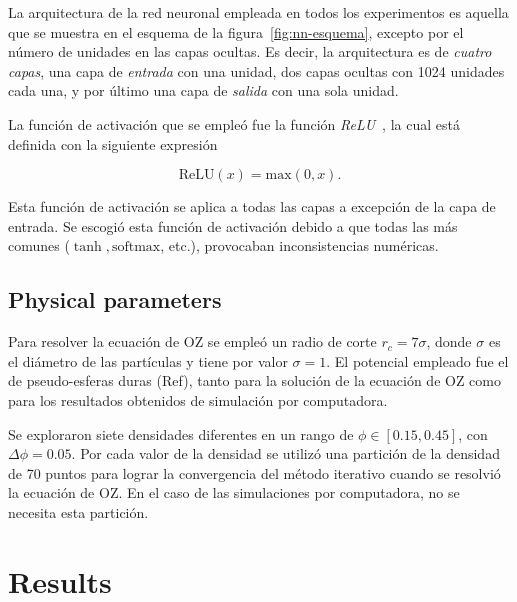 La arquitectura de la red neuronal empleada en todos los experimentos es aquella que se
muestra en el esquema de la figura~\ref{fig:nn-esquema}, excepto por el número de unidades
en las capas ocultas.
Es decir, la arquitectura es de \emph{cuatro capas}, una capa de \emph{entrada} con una
unidad, dos capas ocultas con 1024 unidades cada una, y por último una capa de \emph{salida}
con una sola unidad.

La función de activación que se empleó fue la función \emph{ReLU}~\cite{glorotDeepSparseRectifier2011},
la cual está definida con la siguiente expresión

\begin{equation*}
    \text{ReLU}(x) = \text{max}{(0, x)} .
\end{equation*}

Esta función de activación se aplica a todas las capas a excepción de la capa de entrada.
Se escogió esta función de activación debido a que todas las más comunes ($\tanh, \text{softmax}$, etc.),
provocaban inconsistencias numéricas.

\subsection{Physical parameters}

Para resolver la ecuación de OZ se empleó un radio de corte $r_c=7\sigma$, donde $\sigma$
es el diámetro de las partículas y tiene por valor $\sigma=1$.
El potencial empleado fue el de pseudo-esferas duras (Ref), tanto para la solución de la ecuación
de OZ como para los resultados obtenidos de simulación por computadora.

Se exploraron siete densidades diferentes en un rango de
$\phi \in [\num{0.15}, \num{0.45}]$, con $\Delta \phi = \num{0.05}$. Por cada valor
de la densidad se utilizó una partición de la densidad de 70 puntos para lograr la
convergencia del método iterativo cuando se resolvió la ecuación de OZ. En el caso de las
simulaciones por computadora, no se necesita esta partición.

\section{Results}

